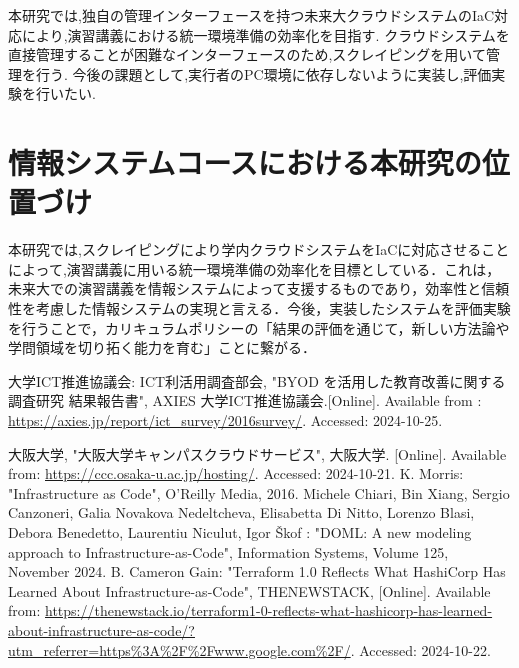 \documentclass[11pt]{ujarticle}\sloppy
\begin{document}
本研究では,独自の管理インターフェースを持つ未来大クラウドシステムのIaC対応により,演習講義における統一環境準備の効率化を目指す.
クラウドシステムを直接管理することが困難なインターフェースのため,スクレイピングを用いて管理を行う.
今後の課題として,実行者のPC環境に依存しないように実装し,評価実験を行いたい.


\section{情報システムコースにおける本研究の位置づけ}

本研究では,スクレイピングにより学内クラウドシステムをIaCに対応させることによって,演習講義に用いる統一環境準備の効率化を目標としている．これは，未来大での演習講義を情報システムによって支援するものであり，効率性と信頼性を考慮した情報システムの実現と言える．今後，実装したシステムを評価実験を行うことで，カリキュラムポリシーの「結果の評価を通じて，新しい方法論や学問領域を切り拓く能力を育む」ことに繋がる．

\begin{thebibliography}{99}
	大学ICT推進協議会: ICT利活用調査部会, "BYOD を活用した教育改善に関する調査研究 結果報告書", AXIES 大学ICT推進協議会.[Online]. Available from : \url{https://axies.jp/report/ict_survey/2016survey/}. Accessed: 2024-10-25.

	大阪大学, "大阪大学キャンパスクラウドサービス", 大阪大学. [Online]. Available from: \url{https://ccc.osaka-u.ac.jp/hosting/}. Accessed: 2024-10-21.
	K. Morris: "Infrastructure as Code", O'Reilly Media, 2016.
	Michele Chiari, Bin Xiang, Sergio Canzoneri, Galia Novakova Nedeltcheva, Elisabetta Di Nitto, Lorenzo Blasi, Debora Benedetto, Laurentiu Niculut, Igor Škof : "DOML: A new modeling approach to Infrastructure-as-Code", Information Systems, Volume 125, November 2024. 
	B. Cameron Gain: "Terraform 1.0 Reflects What HashiCorp Has Learned About Infrastructure-as-Code", THENEWSTACK, [Online]. Available from: \url{https://thenewstack.io/terraform1-0-reflects-what-hashicorp-has-learned-about-infrastructure-as-code/?utm_referrer=https%3A%2F%2Fwww.google.com%2F/}. Accessed: 2024-10-22.
\end{thebibliography}
\end{document}
